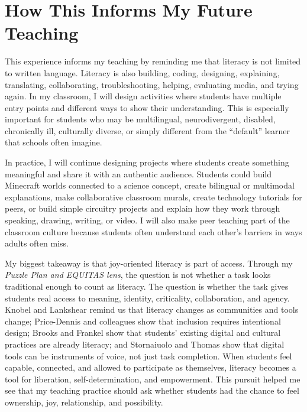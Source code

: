 \documentclass[11pt]{article}
\begin{document}
\section*{How This Informs My Future Teaching}

This experience informs my teaching by reminding me that literacy is not limited to written language. Literacy is also building, coding, designing, explaining, translating, collaborating, troubleshooting, helping, evaluating media, and trying again. In my classroom, I will design activities where students have multiple entry points and different ways to show their understanding. This is especially important for students who may be multilingual, neurodivergent, disabled, chronically ill, culturally diverse, or simply different from the ``default'' learner that schools often imagine.

In practice, I will continue designing projects where students create something meaningful and share it with an authentic audience. Students could build Minecraft worlds connected to a science concept, create bilingual or multimodal explanations, make collaborative classroom murals, create technology tutorials for peers, or build simple circuitry projects and explain how they work through speaking, drawing, writing, or video. I will also make peer teaching part of the classroom culture because students often understand each other's barriers in ways adults often miss.

My biggest takeaway is that joy-oriented literacy is part of access. Through my \textit{Puzzle Plan and EQUITAS lens}, the question is not whether a task looks traditional enough to count as literacy. The question is whether the task gives students real access to meaning, identity, criticality, collaboration, and agency. Knobel and Lankshear remind us that literacy changes as communities and tools change; Price-Dennis and colleagues show that inclusion requires intentional design; Brooks and Frankel show that students' existing digital and cultural practices are already literacy; and Stornaiuolo and Thomas show that digital tools can be instruments of voice, not just task completion. When students feel capable, connected, and allowed to participate as themselves, literacy becomes a tool for liberation, self-determination, and empowerment. This pursuit helped me see that my teaching practice should ask whether students had the chance to feel ownership, joy, relationship, and possibility.
\end{document}
